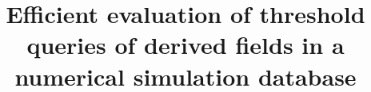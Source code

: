 \documentclass{sig-alternate}
\begin{document}


\title{
Efficient evaluation of threshold queries of derived fields in a numerical simulation database
}
%
%
%
%
%
\end{document}
